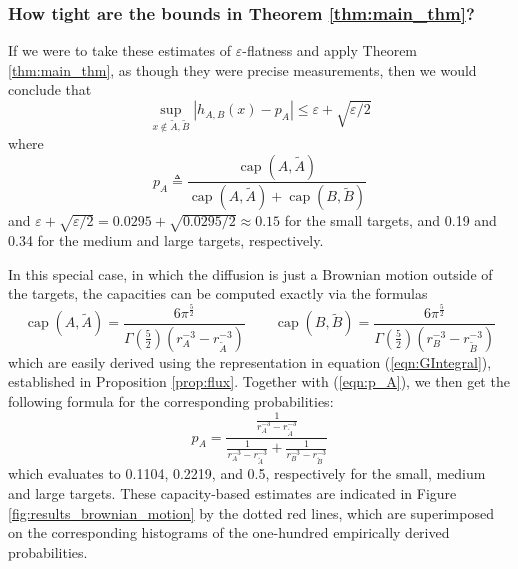 \documentclass[12pt, nofootinbib,english, amsmath, amssymb, aps, priprint, graphicx,floatfix]{revtex4-1}
\theoremstyle{plain}
\theoremstyle{definition}
\theoremstyle{plain}
\newcommand{\capac}[2]{\ensuremath{\operatorname{cap}}(#1,#2)}
\newcommand{\tA}{{\tilde A}}
\newcommand{\tB}{{\tilde B}}
\begin{document}
\subsubsection{How tight are the bounds in Theorem \ref{thm:main_thm}?}
\label{sec:toy_capacity}
If we were to take these estimates of $\varepsilon$-flatness and apply Theorem \ref{thm:main_thm}, as though they were precise measurements, then we would conclude that 
\begin{equation}
\label{eqn:bound}
\sup_{x \notin \tilde A,\tilde B} \left| h_{A,B} (x) -p_A
\right| \leqslant \varepsilon + \sqrt{\varepsilon/2} 
\end{equation}
where 
\begin{equation}
\label{eqn:p_A}
p_A\triangleq 
   \frac{\capac{A}{\tilde A}}{\capac{A}{\tilde A}+\capac{B}{\tilde B}}  
\end{equation}
and $\varepsilon +
\sqrt{\varepsilon/2}=0.0295+\sqrt{0.0295/2}
\approx 0.15$ for the small targets, and 0.19 and 0.34 for the medium and large targets, respectively.

In this special case, in which the diffusion is just a Brownian motion outside of the targets, the capacities can be computed exactly via the formulas
\begin{equation}
\label{eqn:analytic_capacities}
\capac{A}{\tA}  =
\frac{6\pi^{\frac{5}{2}}}
{\Gamma(\frac{5}{2})(r_A^{-3} - r_\tA^{-3})}  \qquad
\capac{B}{\tB}  =
\frac{6\pi^{\frac{5}{2}}}
{\Gamma(\frac{5}{2})(r_B^{-3} - r_\tB^{-3})}
\end{equation}
which are easily derived using the representation in equation (\ref{eqn:GIntegral}), established in Proposition \ref{prop:flux}. Together with (\ref{eqn:p_A}), we then get the following formula for the corresponding probabilities:
\begin{equation*}
p_A = \frac{\frac{1}{r_A^{-3} - r_{\tilde{A}}^{-3}}}{\frac{1}{r_A^{-3} - r_{\tilde{A}}^{-3}} + \frac{1}{r_B^{-3} - r_{\tilde{B}}^{-3}}}
\end{equation*}
which evaluates to 0.1104, 0.2219, and 0.5, respectively for the small, medium and large targets. These capacity-based estimates are indicated in Figure \ref{fig:results_brownian_motion} by the dotted red lines, which are  superimposed on the corresponding histograms of the one-hundred empirically derived probabilities.
\end{document}
